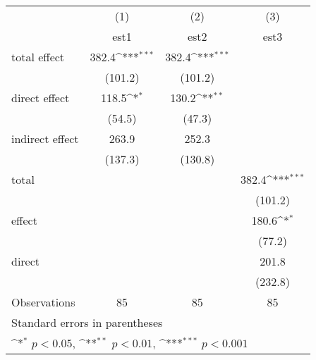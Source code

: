{
\def\sym#1{\ifmmode^{#1}\else\(^{#1}\)\fi}
\begin{tabular}{l*{3}{c}}
\hline\hline
                &\multicolumn{1}{c}{(1)}         &\multicolumn{1}{c}{(2)}         &\multicolumn{1}{c}{(3)}         \\
                &     est1         &     est2         &     est3         \\
\hline
total effect            &    382.4\sym{***}&    382.4\sym{***}&                  \\
                &  (101.2)         &  (101.2)         &                  \\
direct effect           &    118.5\sym{*}  &    130.2\sym{**} &                  \\
                &   (54.5)         &   (47.3)         &                  \\
indirect effect         &    263.9         &    252.3         &                  \\
                &  (137.3)         &  (130.8)         &                  \\
total           &                  &                  &    382.4\sym{***}\\
                &                  &                  &  (101.2)         \\
effect          &                  &                  &    180.6\sym{*}  \\
                &                  &                  &   (77.2)         \\
direct          &                  &                  &    201.8         \\
                &                  &                  &  (232.8)         \\
\hline
Observations    &       85         &       85         &       85         \\
\hline\hline
\multicolumn{4}{l}{\footnotesize Standard errors in parentheses}\\
\multicolumn{4}{l}{\footnotesize \sym{*} \(p<0.05\), \sym{**} \(p<0.01\), \sym{***} \(p<0.001\)}\\
\end{tabular}
}
